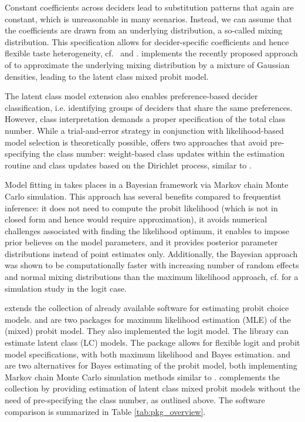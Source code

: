 \documentclass[article,shortnames]{jss}
\begin{document}
Constant coefficients across deciders lead to substitution patterns that again are constant, which is unreasonable in many scenarios. Instead, we can assume that the coefficients are drawn from an underlying distribution, a so-called mixing distribution. This specification allows for decider-specific coefficients and hence flexible taste heterogeneity, cf.\ \cite{Train:2009} and \cite{Bhat:2011}.  implements the recently proposed approach of \cite{Oelschlaeger:2020} to approximate the underlying mixing distribution by a mixture of Gaussian densities, leading to the latent class mixed probit model.

The latent class model extension also enables preference-based decider classification, i.e. identifying groups of deciders that share the same preferences. However, class interpretation demands a proper specification of the total class number. While a trial-and-error strategy in conjunction with likelihood-based model selection is theoretically possible,  offers two approaches that avoid pre-specifying the class number: weight-based class updates within the estimation routine \citep{Oelschlaeger:2020} and class updates based on the Dirichlet process, similar to \cite{Burda:2008}.

Model fitting in  takes places in a Bayesian framework via Markov chain Monte Carlo simulation. This approach has several benefits compared to frequentist inference: it does not need to compute the probit likelihood (which is not in closed form and hence would require approximation), it avoids numerical challenges associated with finding the likelihood optimum, it enables to impose prior believes on the model parameters, and it provides posterior parameter distributions instead of point estimates only. Additionally, the Bayesian approach was shown to be computationally faster with increasing number of random effects and normal mixing distributions than the maximum likelihood approach, cf. \cite{Train:2001} for a simulation study in the logit case.

 extends the collection of already available software for estimating probit choice models.  \citep{Sarrias:2016} and  \citep{Croissant:2020} are two  packages for maximum likelihood estimation (MLE) of the (mixed) probit model. They also implemented the logit model. The  library  \citep{Bierlaire:2020} can estimate latent class (LC) models. The  package \citep{Hess:2019} allows for flexible logit and probit model specifications, with both maximum likelihood and Bayes estimation.  \citep{Rossi:2019} and  \citep{Imai:2022} are two alternatives for Bayes estimating of the probit model, both implementing Markov chain Monte Carlo simulation methods similar to .  complements the collection by providing estimation of latent class mixed probit models without the need of pre-specifying the class number, as outlined above. The software comparison is summarized in Table \ref{tab:pkg_overview}.
\end{document}
